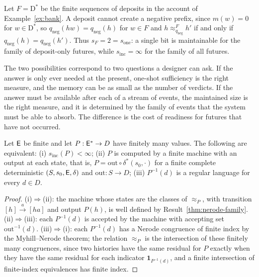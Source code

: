 \begin{example}\label{ex:restrict-updates}
Let $F=\mathrm D^{*}$ be the finite sequences of deposits in the account of Example~\ref{ex:bank}. A deposit cannot create a negative prefix, since $m(w)=0$ for $w\in\mathrm D^{*}$, so $q_{\mathrm{neg}}(hw)=q_{\mathrm{neg}}(h)$ for $w\in F$ and $h\approx^{F}_{q_{\mathrm{neg}}}h'$ if and only if $q_{\mathrm{neg}}(h)=q_{\mathrm{neg}}(h')$. Thus $s_F=2=s_{\mathrm{one}}$: a single bit is maintainable for the family of deposit-only futures, while $s_{\mathrm{inc}}=\infty$ for the family of all futures.
\end{example}

The two possibilities correspond to two questions a designer can ask. If the answer is only ever needed at the present, one-shot sufficiency is the right measure, and the memory can be as small as the number of verdicts. If the answer must be available after each of a stream of events, the maintained size is the right measure, and it is determined by the family of events that the system must be able to absorb. The difference is the cost of readiness for futures that have not occurred.

\begin{established}\label{prop:regular}
Let $\mathsf{E}$ be finite and let $P:\mathsf{E}^{*}\to D$ have finitely many values. The following are equivalent: (i) $s_{\mathrm{inc}}(P)<\infty$; (ii) $P$ is computed by a finite machine with an output at each state, that is, $P=\mathrm{out}\circ\delta^{*}(s_0,\cdot)$ for a finite complete deterministic $(S,s_0,\mathsf{E},\delta)$ and $\mathrm{out}:S\to D$; (iii) $P^{-1}(d)$ is a regular language for every $d\in D$.
\end{established}
\begin{proof}
(i)$\Rightarrow$(ii): the machine whose states are the classes of $\approx_P$, with transition $[h]\xrightarrow{a}[ha]$ and output $P(h)$, is well defined by Result~\ref{thm:nerode-family}. (ii)$\Rightarrow$(iii): each $P^{-1}(d)$ is accepted by the machine with accepting set $\mathrm{out}^{-1}(d)$. (iii)$\Rightarrow$(i): each $P^{-1}(d)$ has a Nerode congruence of finite index by the Myhill--Nerode theorem; the relation $\approx_P$ is the intersection of these finitely many congruences, since two histories have the same residual for $P$ exactly when they have the same residual for each indicator $\mathbf 1_{P^{-1}(d)}$, and a finite intersection of finite-index equivalences has finite index.
\end{proof}

